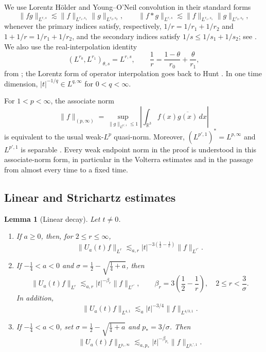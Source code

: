 \documentclass[preprint,12pt]{elsarticle}
\numberwithin{equation}{section}
\newtheorem{lemma}{Lemma}[section]
\theoremstyle{definition}
\theoremstyle{remark}
\newcommand{\R}{\mathbb R}
\newcommand{\norm}[2]{\lVert #1\rVert_{#2}}
\begin{document}
We use Lorentz H\"older and Young--O'Neil convolution in their standard
forms
\[
 \norm{fg}{L^{r,s}}
 \lesssim\norm{f}{L^{r_1,s_1}}\norm{g}{L^{r_2,s_2}},
 \qquad
 \norm{f*g}{L^{r,s}}
 \lesssim\norm{f}{L^{r_1,s_1}}\norm{g}{L^{r_2,s_2}},
\]
whenever the primary indices satisfy, respectively,
$1/r=1/r_1+1/r_2$ and $1+1/r=1/r_1+1/r_2$, and the secondary indices
satisfy $1/s\leq1/s_1+1/s_2$; see
\cite{ONeil}. We also use the real-interpolation
identity
\[
 (L^{r_0},L^{r_1})_{\theta,s}=L^{r,s},
 \qquad \frac1r=\frac{1-\theta}{r_0}+\frac\theta{r_1},
\]
from \cite[Chapter~5]{BerghLofstrom}; the Lorentz form of operator
interpolation goes back to Hunt \cite{Hunt}. In one time dimension,
$|t|^{-1/q}\in L^{q,\infty}$ for $0<q<\infty$.

For $1<p<\infty$, the associate norm
\[
 \norm{f}{(p,\infty)}
 =\sup_{\norm{g}{L^{p',1}}\leq1}
   \left|\int_{\R^3}f(x)\overline{g(x)}\,dx\right|
\]
is equivalent to the usual weak-$L^p$ quasi-norm. Moreover,
$(L^{p',1})^*=L^{p,\infty}$ and $L^{p',1}$ is separable
\cite[Chapter~IV]{BennettSharpley}. Every weak endpoint norm in the
proof is understood in this associate-norm form, in particular in the
Volterra estimates and in the passage from almost every time to a
fixed time.

\subsection{Linear and Strichartz estimates}

\begin{lemma}[Linear decay]
\label{lem:linear}
Let $t\neq0$.
\begin{enumerate}
 \item If $a\geq0$, then, for $2\leq r\leq\infty$,
 \begin{equation}
  \norm{U_a(t)f}{L^r}
  \lesssim_{a,r}|t|^{-3(\frac12-\frac1r)}\norm{f}{L^{r'}}.
  \label{eq:linear-nonnegative}
 \end{equation}
 \item If $-\frac14<a<0$ and
 $\sigma=\frac12-\sqrt{\frac14+a}$, then
 \begin{equation}
  \norm{U_a(t)f}{L^r}
  \lesssim_{a,r}|t|^{-\beta_r}\norm{f}{L^{r'}},
  \qquad \beta_r=3\left(\frac12-\frac1r\right),
  \quad 2\leq r<\frac3\sigma.
  \label{eq:linear-attractive}
 \end{equation}
 In addition,
 \[
  \norm{U_a(t)f}{L^{4,1}}
  \lesssim_a |t|^{-3/4}\norm{f}{L^{4/3,1}}.
 \]
 \item If $-\frac14<a<0$, set
 $\sigma=\frac12-\sqrt{\frac14+a}$ and $p_*=3/\sigma$. Then
 \begin{equation}
  \norm{U_a(t)f}{L^{p_*,\infty}}
  \lesssim_{a,p_*}|t|^{-\beta_{p_*}}
  \norm{f}{L^{p_*',1}}.
  \label{eq:linear-weak-endpoint}
 \end{equation}
\end{enumerate}
\end{lemma}
\end{document}
